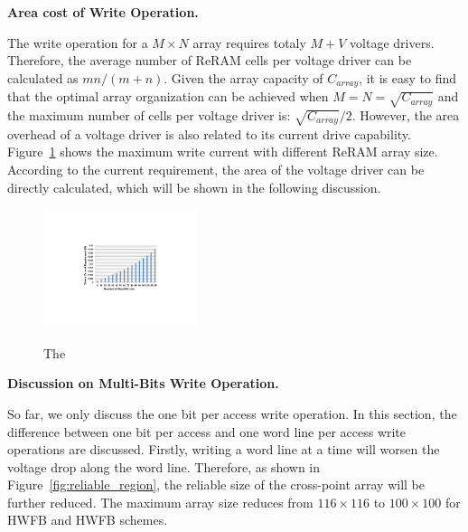 \vspace{6pt} \textbf{Area cost of Write Operation.} \vspace{6pt}

The write operation for a $M \times N$ array requires totaly $M+V$ voltage drivers. Therefore, the average number of ReRAM cells per voltage driver can be calculated as $mn/(m+n)$. Given the array capacity of $C_{array}$, it is easy to find that the optimal array organization can be achieved when $M=N=\sqrt{C_{array}}$ and the maximum number of cells per voltage driver is: $\sqrt{C_{array}}/2$. However, the area overhead of a voltage driver is also related to its current drive capability. Figure~\ref{fig:w_current} shows the maximum write current with different ReRAM array size. According to the current requirement, the area of the voltage driver can be directly calculated, which will be shown in the following discussion.

\begin{figure}%
\centering
  \includegraphics[width=0.4\textwidth]{./figures/w_current2.pdf}\\
  \caption{The }\label{fig:w_current}
\end{figure}

\vspace{6pt} \textbf{Discussion on Multi-Bits Write Operation.} \vspace{6pt}

So far, we only discuss the one bit per access write operation. In this section, the difference between one bit per access and one word line per access write operations are discussed. Firstly, writing a word line at a time will worsen the voltage drop along the word line. Therefore, as shown in Figure~\ref{fig:reliable_region}, the reliable size of the cross-point array will be further reduced. The maximum array size reduces from $116{\times}116$ to $100{\times}100$ for HWFB and HWFB schemes.


